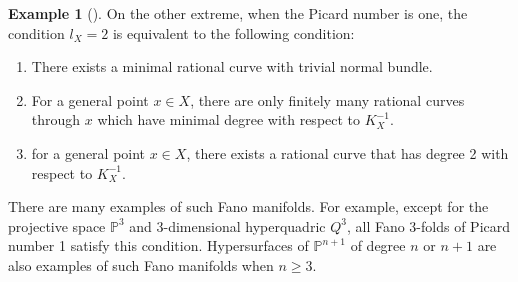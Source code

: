 \documentclass[12pt]{amsart}
\theoremstyle{definition}
\newtheorem{ex}[thm]{Example}
\newcommand{\IP}{{\mathbb P}}
\newcommand{\CH}{{\mathcal H}}
\newcommand{\CO}{{\mathcal O}}
\newcommand{\gee}{\geqslant}
\begin{document}
\begin{ex}[\cite{HM03}]\label{ex-l2}
On the other extreme, when the Picard number is one, the condition $l_X=2$ is equivalent to the following condition:
     \begin{enumerate}
         \item There exists a minimal rational curve with trivial normal bundle. 
         \item For a general point $x\in X$, there are only finitely many rational curves through $x$ which have minimal degree with respect to $K_X^{-1}$. 
         \item for a general point $x\in X$, there exists a rational curve that has degree 2 with respect to $K_X^{-1}$.       
     \end{enumerate}
    There are many examples of such Fano manifolds. For example, except for the projective space $\IP^3$ and 3-dimensional hyperquadric $Q^3$, all Fano 3-folds of Picard number 1 satisfy this condition.
    Hypersurfaces of $\IP^{n+1}$ of degree $n$ or $n+1$ are also examples of such Fano manifolds when $n\gee 3$. 
\end{ex}
\end{document}
